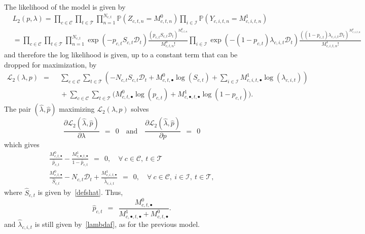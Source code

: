 The likelihood of the model is given by
\begin{align*}
& L_{2}(p,\lambda)    = \prod_{c \in \mathcal{C}} \prod_{t \in \mathcal{T}} \prod_{n=1}^{N_{c,t}} \mathbb{P}(Z_{c,t,n} = M_{c,t,n}^{0}) \prod_{i \in \mathcal{I}} \mathbb{P}(Y_{c,i,t,n} = M_{c,i,t,n}^{1}) \\
& =  \prod_{c \in \mathcal{C}} \prod_{t \in \mathcal{T}} \prod_{n=1}^{N_{c,t}} \exp(-p_{c,t} S_{c,t} \mathcal{D}_{t}) \frac{(p_{c,t} S_{c,t} \mathcal{D}_{t})^{M_{c,t,n}^{0}}}{M_{c,t,n}^{0}!} \prod_{i \in \mathcal{I}} \exp(-(1-p_{c,t}) \lambda_{c,i,t} \mathcal{D}_{t}) \frac{((1-p_{c,t}) \lambda_{c,i,t} \mathcal{D}_{t})^{M_{c,i,t,n}^{1}}}{M_{c,i,t,n}^{1}!}
\end{align*}
and therefore the log likelihood is given, up to a constant term that can be dropped for maximization, by
\begin{align*}
\mathscr{L}_{2}(\lambda,p) \ \ = \ \ & \sum_{c \in \mathcal{C}} \sum_{t \in \mathcal{T}} \left(-N_{c,t} S_{c,t} \mathcal{D}_{t} + M_{c,t,\bullet}^{0} \log(S_{c,t}) + \sum_{i \in \mathcal{I}} M_{c,i,t,\bullet}^{1} \log(\lambda_{c,i,t})\right) \\
& {} + \sum_{c \in \mathcal{C}} \sum_{t \in \mathcal{T}} \Big(M_{c,t,\bullet}^{0} \log(p_{c,t}) + M_{c,\bullet,t,\bullet}^{1} \log(1-p_{c,t})\Big).
\end{align*}
The pair $(\hat{\lambda},\hat{p})$ maximizing $\mathscr{L}_{2}(\lambda,p)$ solves
$$
\frac{\partial \mathscr{L}_{2}(\hat{\lambda},\hat{p})}{\partial \lambda} \ \ = \ \ 0 \quad \mbox{and} \quad \frac{\partial \mathscr{L}_{2}(\hat{\lambda},\hat{p})}{\partial p} \ \ = \ \ 0
$$
which gives
\begin{equation}
\label{solvelp}
\begin{array}{l}
\displaystyle \frac{M_{c,t,\bullet}^{0}}{\hat{p}_{c,t}} - \frac{M_{c,\bullet,t,\bullet}^{1}}{1-\hat{p}_{c,t}} \ \ = \ \ 0, \quad \forall \ c \in \mathcal{C}, \ t \in \mathcal{T} \\
\displaystyle \frac{M_{c,t,\bullet}^{0}}{\hat{S}_{c,t}} - N_{c,t} \mathcal{D}_{t} + \frac{M_{c,i,t,\bullet}^{1}}{\hat{\lambda}_{c,i,t}} \ \ = \ \ 0, \quad \forall \ c \in \mathcal{C}, \ i \in \mathcal{I}, \ t \in \mathcal{T},
\end{array}
\end{equation}
where $\hat{S}_{c,t}$ is given by~\eqref{defshat}.
Thus,
\begin{equation}
\label{estimpct2}
\hat{p}_{c,t} \ \ = \ \ \frac{M_{c,t,\bullet}^{0}}{M_{c,\bullet,t,\bullet}^{1} + M_{c,t,\bullet}^{0}}.
\end{equation}
and $\hat{\lambda}_{c,i,t}$ is still given by~\eqref{lambdaf}, as for the previous model.

